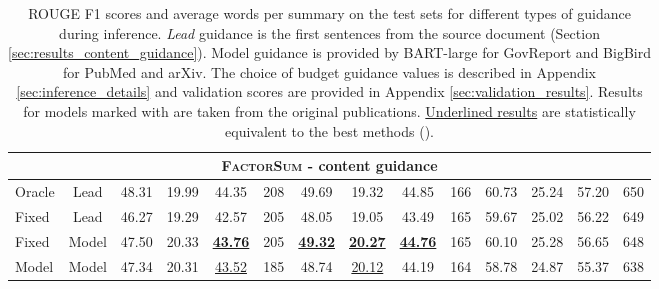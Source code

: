 \documentclass[11pt,table]{article}
\newcommand{\modelname}{FactorSum}
\begin{document}
\begin{table*}[h]
\begin{tabular}{lc|cccc|cccc|cccc}
    \midrule
    \multicolumn{14}{c}{\textbf{\textsc{\modelname} - content guidance}} \\
    \midrule
    Oracle & Lead & 48.31 & 19.99 & 44.35 & 208 & 49.69 & 19.32 & 44.85 & 166 & 60.73 & 25.24 & 57.20 & 650 \\
    Fixed & Lead & 46.27 & 19.29 & 42.57 & 205 & 48.05 & 19.05 & 43.49 & 165 & 59.67 & 25.02 & 56.22 & 649 \\
    Fixed & Model & 47.50 & 20.33 & \underline{\textbf{43.76}} & 205 & \underline{\textbf{49.32}} & \underline{\textbf{20.27}} & \underline{\textbf{44.76}} & 165 & 60.10 & 25.28 & 56.65 & 648 \\
    Model & Model & 47.34 & 20.31 & \underline{43.52} & 185 & 48.74 & \underline{20.12} & 44.19 & 164 & 58.78 & 24.87 & 55.37 & 638 \\
    \bottomrule
  \end{tabular}
  \caption{ROUGE F1 scores and average words per summary on the test sets for different types of guidance during inference. \emph{Lead} guidance is the first  sentences from the source document (Section \ref{sec:results_content_guidance}). Model guidance is provided by BART-large for GovReport and BigBird for PubMed and arXiv. The choice of budget guidance values is described in Appendix \ref{sec:inference_details} and validation scores are provided in Appendix  \ref{sec:validation_results}. Results for models marked with  are taken from the original publications. \underline{Underlined results} are statistically  equivalent to the best methods ().}\label{tab:experiment_results}
\end{table*}
\end{document}
